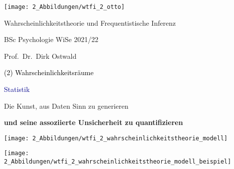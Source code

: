 \documentclass[
  8pt,
  ignorenonframetext,
]{beamer}
\author{}
\date{\vspace{-2.5em}}
\begin{document}
\begin{frame}[plain]{}
\protect\hypertarget{section}{}
\center

\begin{center}\texttt{[image: 2\_Abbildungen/wtfi\_2\_otto]} \end{center}

\vspace{2mm}

\Large

Wahrscheinlichkeitstheorie und Frequentistische Inferenz \vspace{6mm}

\large

BSc Psychologie WiSe 2021/22

\vspace{6mm}
\large

Prof.~Dr.~Dirk Ostwald
\end{frame}

\begin{frame}[plain]{}
\protect\hypertarget{section-1}{}
\vfill
\center
\huge

\textcolor{black}{(2) Wahrscheinlichkeitsräume} \vfill
\end{frame}

\begin{frame}{}
\protect\hypertarget{section-2}{}
\center
\huge

\textcolor{darkblue}{Statistik} \vspace{5mm}

\Large

Die Kunst, aus Daten Sinn zu generieren

\textbf{und seine assoziierte Unsicherheit zu quantifizieren}
\end{frame}

\begin{frame}{}
\protect\hypertarget{section-3}{}
\begin{center}\texttt{[image: 2\_Abbildungen/wtfi\_2\_wahrscheinlichkeitstheorie\_modell]} \end{center}
\end{frame}

\begin{frame}{}
\protect\hypertarget{section-4}{}
\begin{center}\texttt{[image: 2\_Abbildungen/wtfi\_2\_wahrscheinlichkeitstheorie\_modell\_beispiel]} \end{center}
\end{frame}
\end{document}
